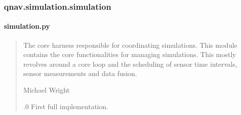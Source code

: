 \documentclass[letterpaper,10pt,english]{sphinxmanual}
\begin{document}
\sphinxstepscope


\subsubsection{qnav.simulation.simulation}
\label{\detokenize{modules/simulation/results:module-qnav.simulation.simulation}}\label{\detokenize{modules/simulation/results:qnav-simulation-simulation}}\label{\detokenize{modules/simulation/results::doc}}

\paragraph{simulation.py}
\label{\detokenize{modules/simulation/results:simulation-py}}\begin{quote}\begin{description}
\sphinxAtStartPar
The core harness responsible for coordinating simulations.
This module contains the core functionalities for managing simulations.
This mostly revolves around a core loop and the scheduling of sensor
time intervals, sensor measurements and data fusion.

\sphinxAtStartPar
Michael Wright \sphinxhyphen{} 

.0 \sphinxhyphen{} First full implementation.

\end{description}\end{quote}
\end{document}
